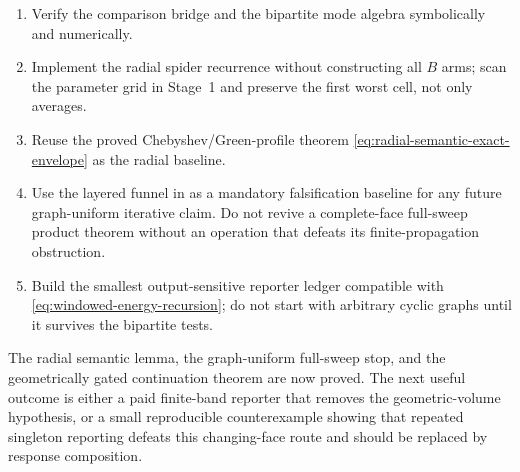 \begin{enumerate}[leftmargin=*]
\item Verify the comparison bridge and the bipartite mode algebra symbolically
      and numerically.
\item Implement the radial spider recurrence without constructing all $B$
      arms; scan the parameter grid in Stage~1 and preserve the first worst
      cell, not only averages.
\item Reuse the proved Chebyshev/Green-profile theorem
      \eqref{eq:radial-semantic-exact-envelope} as the radial baseline.
\item Use the layered funnel in  as a
      mandatory falsification baseline for any future graph-uniform iterative
      claim.  Do not revive a complete-face full-sweep product theorem without
      an operation that defeats its finite-propagation obstruction.
\item Build the smallest output-sensitive reporter ledger compatible with
      \eqref{eq:windowed-energy-recursion}; do not start with arbitrary cyclic
      graphs until it survives the bipartite tests.
\end{enumerate}

The radial semantic lemma, the graph-uniform full-sweep stop, and the
geometrically gated continuation theorem are now proved.  The next useful
outcome is either a paid finite-band reporter that removes the
geometric-volume hypothesis, or a small reproducible counterexample showing
that repeated singleton reporting defeats this changing-face route and
should be replaced by response composition.
